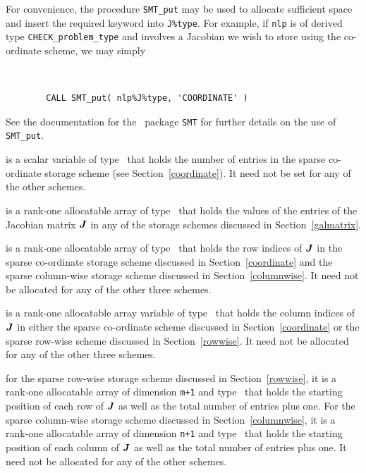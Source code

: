\documentclass{galahad}
\newcommand{\packagename}{CHECK}
\begin{document}
\begin{description}
\begin{description}
For convenience, the procedure {\tt SMT\_put} 
may be used to allocate sufficient space and insert the required keyword
into {\tt J\%type}.
For example, if {\tt nlp} is of derived type {\tt \packagename\_problem\_type}
and involves a Jacobian we wish to store using the co-ordinate scheme,
we may simply
{\tt 
\begin{verbatim}
        CALL SMT_put( nlp%J%type, 'COORDINATE' )
\end{verbatim}
}
\noindent
See the documentation for the \galahad\ package {\tt SMT} 
for further details on the use of {\tt SMT\_put}.

 is a scalar variable of type \integer\ that 
holds the number of entries in the sparse co-ordinate storage scheme
(see Section~\ref{coordinate}). 
It need not be set for any of the other schemes.

 is a rank-one allocatable array of type \realdp\ that holds
the values of the entries of the Jacobian matrix ${\bm{J}}$ in any of the 
storage schemes discussed in Section~\ref{galmatrix}.

 is a rank-one allocatable array of type \integer\
that holds the row indices of ${\bm{J}}$ 
in the sparse co-ordinate storage
scheme discussed in Section~\ref{coordinate} and the sparse column-wise storage
scheme discussed in Section~\ref{columnwise}.
It need not be allocated for any of the other three schemes.

 is a rank-one allocatable array variable of type \integer\
that holds the column indices of ${\bm{J}}$ in either the sparse co-ordinate 
scheme discussed in Section~\ref{coordinate} or the sparse row-wise 
scheme discussed in Section~\ref{rowwise}.
It need not be allocated for any of the other three schemes.

 for the sparse row-wise storage
scheme discussed in Section~\ref{rowwise}, it is a rank-one allocatable array of dimension {\tt m+1} and type 
\integer\ that holds the starting position of 
each row of ${\bm{J}}$ as well
as the total number of entries plus one. For the sparse column-wise storage
scheme discussed in Section~\ref{columnwise}, it is a rank-one allocatable array of dimension {\tt n+1} and type 
\integer\ that holds the starting position of 
each column of ${\bm{J}}$ as well
as the total number of entries plus one. It need not be
allocated for any of the other schemes.

\end{description}


\end{description}
\end{document}

